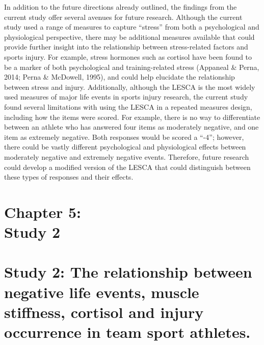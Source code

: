 \documentclass[
  english,
  man,floatsintext]{apa6}
\begin{document}
In addition to the future directions already outlined, the findings from the current study offer several avenues for future research.
Although the current study used a range of measures to capture \enquote{stress} from both a psychological and physiological perspective, there may be additional measures available that could provide further insight into the relationship between stress-related factors and sports injury.
For example, stress hormones such as cortisol have been found to be a marker of both psychological and training-related stress (Appaneal \& Perna, 2014; Perna \& McDowell, 1995), and could help elucidate the relationship between stress and injury.
Additionally, although the LESCA is the most widely used measures of major life events in sports injury research, the current study found several limitations with using the LESCA in a repeated measures design, including how the items were scored.
For example, there is no way to differentiate between an athlete who has answered four items as moderately negative, and one item as extremely negative.
Both responses would be scored a \enquote{-4}; however, there could be vastly different psychological and physiological effects between moderately negative and extremely negative events. Therefore, future research could develop a modified version of the LESCA that could distinguish between these types of responses and their effects.
\clearpage

\vspace*{3cm}

\section[Chapter 5: Study 2]{\Large{Chapter 5: \\ Study 2}}

\clearpage

\section{Study 2: The relationship between negative life events, muscle stiffness, cortisol and injury occurrence in team sport athletes.}
\end{document}
